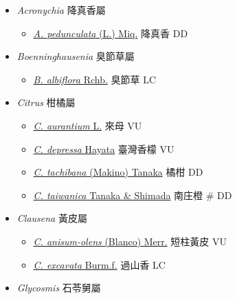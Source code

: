 
  \begin{itemize}
 \item[] \textit{Acronychia} 降真香屬
                                
  \begin{itemize}
        \item[] \href{http://www.theplantlist.org/tpl1.1/search?q=Acronychia+pedunculata}{\textit{A. pedunculata} (L.) Miq.}   降真香   DD
  \end{itemize}
 \item[] \textit{Boenninghausenia} 臭節草屬
                                
  \begin{itemize}
        \item[] \href{http://www.theplantlist.org/tpl1.1/search?q=Boenninghausenia+albiflora}{\textit{B. albiflora} Rchb.}   臭節草   LC
  \end{itemize}
 \item[] \textit{Citrus} 柑橘屬
                                
  \begin{itemize}
        \item[] \href{http://www.theplantlist.org/tpl1.1/search?q=Citrus+aurantium}{\textit{C. aurantium} L.}   來母   VU
        \item[] \href{http://www.theplantlist.org/tpl1.1/search?q=Citrus+depressa}{\textit{C. depressa} Hayata}   臺灣香檬   VU
        \item[] \href{http://www.theplantlist.org/tpl1.1/search?q=Citrus+tachibana}{\textit{C. tachibana} (Makino) Tanaka}   橘柑   DD
        \item[] \href{http://www.theplantlist.org/tpl1.1/search?q=Citrus+taiwanica}{\textit{C. taiwanica} Tanaka \& Shimada}   南庄橙  \# DD
  \end{itemize}
 \item[] \textit{Clausena} 黃皮屬
                                
  \begin{itemize}
        \item[] \href{http://www.theplantlist.org/tpl1.1/search?q=Clausena+anisum-olens}{\textit{C. anisum-olens} (Blanco) Merr.}   短柱黃皮   VU
        \item[] \href{http://www.theplantlist.org/tpl1.1/search?q=Clausena+excavata}{\textit{C. excavata} Burm.f.}   過山香   LC
  \end{itemize}
 \item[] \textit{Glycosmis} 石苓舅屬
                                

\end{itemize}
